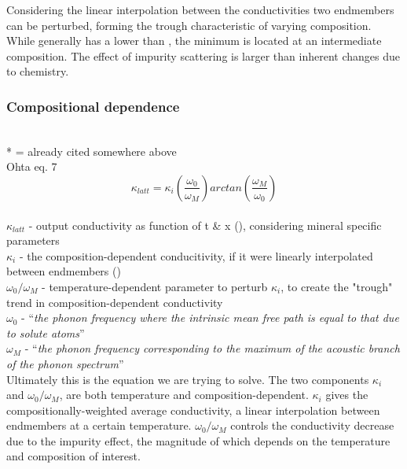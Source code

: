 Considering \citet{Ohta2017} the linear interpolation between the conductivities two endmembers can be perturbed, forming the trough characteristic of varying composition. While \fesios generally has a lower \tcs than \mgsio, the minimum is located at an intermediate composition. The effect of impurity scattering is larger than inherent changes due to chemistry.
    
\subsubsection{Compositional dependence}
\cite{Ohta2017}\\
* = already cited somewhere above\\

Ohta eq. 7 
\begin{equation}%
\kappa_{latt}=\kappa_{i}\left ( \frac{\omega_{0}}{\omega_{M}} \right )arctan\left ( \frac{\omega_{M}}{\omega_{0}} \right )
\label{eq.ohta7}
\end{equation}%
\\ $\kappa_{latt}$ - output conductivity as function of t \& x (\wmk), considering mineral specific parameters\\
$\kappa_{i}$ - the composition-dependent conducitivity, if it were linearly interpolated between endmembers (\wmk)\\
$\omega_{0}/\omega_{M}$ - temperature-dependent parameter to perturb $\kappa_{i}$, to create the "trough" trend in composition-dependent conductivity\\
$\omega_{0}$ - \enquote{\textit{the phonon frequency where the intrinsic mean free path is equal to that due to solute atoms}}\\
$\omega_{M}$ - \enquote{\textit{the phonon frequency corresponding to the maximum of the acoustic branch of the phonon spectrum}}\\

Ultimately this is the equation we are trying to solve. The two components $\kappa_{i}$ and $\omega_{0}/\omega_{M}$, are both temperature and composition-dependent. $\kappa_{i}$ gives the compositionally-weighted average conductivity, a linear interpolation between endmembers at a certain temperature. $\omega_{0}/\omega_{M}$ controls the conductivity decrease due to the impurity effect, the magnitude of which depends on the temperature and composition of interest.\\

